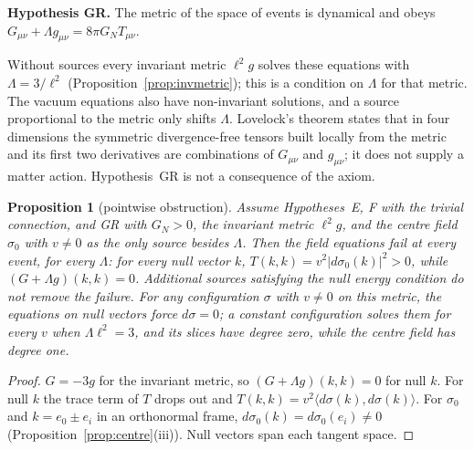 \documentclass[aps,pra,onecolumn,superscriptaddress,nofootinbib,10pt]{revtex4-2}
\newtheorem{proposition}[theorem]{Proposition}
\theoremstyle{definition}
\theoremstyle{remark}
\newcommand{\ip}[2]{\langle #1,#2\rangle}
\begin{document}
\smallskip\noindent\textbf{Hypothesis GR.}  The metric of the space of events is dynamical and obeys
$G_{\mu\nu}+\Lambda g_{\mu\nu}=8\pi G_NT_{\mu\nu}$.

\smallskip\noindent Without sources every invariant metric $\ell^2g$ solves these equations with $\Lambda=3/\ell^2$
(Proposition~\ref{prop:invmetric}); this is a condition on $\Lambda$ for that metric.  The vacuum equations also
have non-invariant solutions, and a source proportional to the metric only shifts $\Lambda$.  Lovelock's
theorem \cite{Lovelock} states that in four dimensions the symmetric divergence-free tensors built locally
from the metric and its first two derivatives are combinations of $G_{\mu\nu}$ and $g_{\mu\nu}$; it does not
supply a matter action.  Hypothesis~GR is not a consequence of the axiom.

\begin{proposition}[pointwise obstruction]\label{prop:nullobstruction}
Assume Hypotheses~E, F with the trivial connection, and GR with $G_N>0$, the invariant metric $\ell^2g$,
and the centre field $\sigma_0$ with $v\ne0$ as the only source besides $\Lambda$.  Then the field equations fail
at every event, for every $\Lambda$: for every null vector $k$, $T(k,k)=v^2\lvert d\sigma_0(k)\rvert^2>0$, while
$(G+\Lambda g)(k,k)=0$.  Additional sources satisfying the null energy condition do not remove the
failure.  For any configuration $\sigma$ with $v\ne0$ on this metric, the equations on null vectors force
$d\sigma=0$; a constant configuration solves them for every $v$ when $\Lambda\ell^2=3$, and its slices have degree zero, while the
centre field has degree one.
\end{proposition}
\begin{proof}
$G=-3g$ for the invariant metric, so $(G+\Lambda g)(k,k)=0$ for null $k$.  For null $k$ the trace term of
$T$ drops out and $T(k,k)=v^2\ip{d\sigma(k)}{d\sigma(k)}$.  For $\sigma_0$ and $k=e_0\pm e_i$ in an orthonormal
frame, $d\sigma_0(k)=d\sigma_0(e_i)\ne0$ (Proposition~\ref{prop:centre}(iii)).  Null vectors span each tangent space.
\end{proof}
\end{document}
